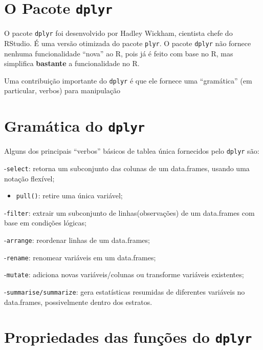 \documentclass[a4paper]{book}
\providecommand{\tightlist}{%
  \setlength{\itemsep}{0pt}\setlength{\parskip}{0pt}}
\begin{document}
\hypertarget{o-pacote-dplyr}{%
\section{\texorpdfstring{O Pacote \texttt{dplyr}}{O Pacote dplyr}}\label{o-pacote-dplyr}}

O pacote \texttt{dplyr} foi desenvolvido por Hadley Wickham, cientista chefe do RStudio. É uma versão otimizada do pacote \texttt{plyr}. O pacote \texttt{dplyr} não fornece nenhuma funcionalidade ``nova'' ao R, pois já é feito com base no R, mas simplifica \textbf{bastante} a funcionalidade no R.

Uma contribuição importante do \texttt{dplyr} é que ele fornece uma ``gramática'' (em particular, verbos) para manipulação

\hypertarget{gramuxe1tica-do-dplyr}{%
\section{\texorpdfstring{Gramática do \texttt{dplyr}}{Gramática do dplyr}}\label{gramuxe1tica-do-dplyr}}

Alguns dos principais ``verbos'' básicos de tablea única fornecidos pelo \texttt{dplyr} são:

-\texttt{select}: retorna um subconjunto das colunas de um data.frames, usando uma notação flexível;

\begin{itemize}
\tightlist
\item
  \texttt{pull()}: retire uma única variável;
\end{itemize}

-\texttt{filter}: extrair um subconjunto de linhas(observações) de um data.frames com base em condições lógicas;

-\texttt{arrange}: reordenar linhas de um data.frames;

-\texttt{rename}: renomear variáveis em um data.frames;

-\texttt{mutate}: adiciona novas variáveis/colunas ou transforme variáveis existentes;

-\texttt{summarise/summarize}: gera estatísticas resumidas de diferentes variáveis no data.frames, possivelmente dentro dos estratos.

\hypertarget{propriedades-das-funuxe7uxf5es-do-dplyr}{%
\section{\texorpdfstring{Propriedades das funções do \texttt{dplyr}}{Propriedades das funções do dplyr}}\label{propriedades-das-funuxe7uxf5es-do-dplyr}}
\end{document}
